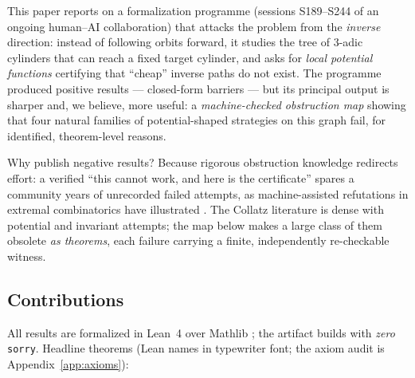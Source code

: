 \documentclass[11pt]{amsart}
\theoremstyle{definition}
\theoremstyle{remark}
\begin{document}
This paper reports on a formalization programme (sessions S189--S244 of an
ongoing human--AI collaboration) that attacks the problem from the
\emph{inverse} direction: instead of following orbits forward, it studies the
tree of $3$-adic cylinders that can reach a fixed target cylinder, and asks
for \emph{local potential functions} certifying that ``cheap'' inverse paths
do not exist.  The programme produced positive results --- closed-form
barriers --- but its principal output is sharper and, we believe, more
useful: a \emph{machine-checked obstruction map} showing that four natural
families of potential-shaped strategies on this graph fail, for identified,
theorem-level reasons.

Why publish negative results?  Because rigorous obstruction knowledge
redirects effort: a verified ``this cannot work, and here is the
certificate'' spares a community years of unrecorded failed attempts, as
machine-assisted refutations in extremal combinatorics have illustrated
\cite{Wagner2021}.  The Collatz literature is dense with potential and invariant
attempts; the map below makes a large class of them obsolete \emph{as
theorems}, each failure carrying a finite, independently re-checkable
witness.

\subsection*{Contributions}
All results are formalized in Lean~4 \cite{Lean4} over Mathlib
\cite{Mathlib2020}; the artifact builds with \emph{zero} \texttt{sorry}.
Headline theorems (Lean names in typewriter font; the axiom audit is
Appendix~\ref{app:axioms}):
\end{document}
